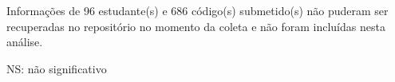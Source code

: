 \begin{table}[H]
\begin{threeparttable}
    \begin{tablenotes}
        \item Informações de 96 estudante(s) e 686 código(s) submetido(s) não puderam ser recuperadas no repositório no momento da coleta e não foram incluídas nesta análise.
        \item NS: não significativo
    \end{tablenotes}
    \end{threeparttable}
\end{table}